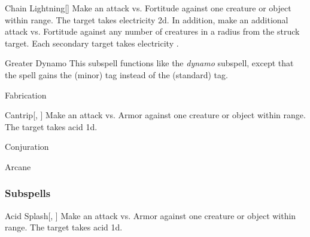 \begin{ability}[\nth{4}]{Chain Lightning}[]
Make an attack vs. Fortitude against one creature or object within \rngmed range.
\hit The target takes electricity  \plus2d.
In addition, make an additional attack vs. Fortitude against any number of creatures in a \areamed radius from the struck target.
\hit Each secondary target takes electricity .
\end{ability}
\vspace{0.25em}


\begin{ability}[\nth{4}]{Greater Dynamo}
This subspell functions like the \textit{dynamo} subspell, except that the spell gains the  (minor) tag instead of the  (standard) tag.
\end{ability}
\vspace{0.25em}

\newpage
\begin{spellsection}{Fabrication}

\begin{spellheader}
\end{spellheader}


\begin{ability}{Cantrip}[, ]
Make an attack vs. Armor against one creature or object within \rngmed range.
\hit The target takes acid  \minus1d.
\end{ability}




 Conjuration

 Arcane
\end{spellsection}


\subsubsection{Subspells}


\begin{ability}[\nth{1}]{Acid Splash}[, ]
Make an attack vs. Armor against one creature or object within \rngmed range.
\hit The target takes acid  \plus1d.
\end{ability}
\vspace{0.25em}


